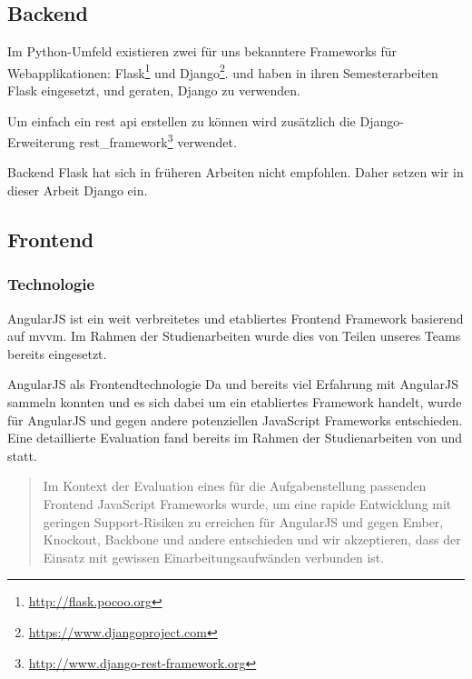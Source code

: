 \subsection{Backend}
Im Python-Umfeld existieren zwei für uns bekanntere Frameworks für Webapplikationen: Flask\footnote{\url{http://flask.pocoo.org}} und Django\footnote{\url{https://www.djangoproject.com}}. \fsc und \rli haben in ihren Semesterarbeiten Flask eingesetzt, und geraten, Django zu verwenden.

Um einfach ein \acs{rest} \acs{api} erstellen zu können wird zusätzlich die Django-Erweiterung rest\_framework\footnote{\url{http://www.django-rest-framework.org}} verwendet.

\begin{decision}{Backend}
Flask hat sich in früheren Arbeiten nicht empfohlen. Daher setzen wir in dieser Arbeit Django ein.
\end{decision}



\subsection{Frontend}
\subsubsection{Technologie}
AngularJS ist ein weit verbreitetes und etabliertes Frontend Framework basierend auf \acs{mvvm}. Im Rahmen der Studienarbeiten wurde dies von Teilen unseres Teams bereits eingesetzt.

\begin{decision}[label=dec:frontend:technology]{AngularJS als Frontendtechnologie}
Da \chuf und \fscf bereits viel Erfahrung mit AngularJS sammeln konnten und es sich dabei um ein etabliertes Framework handelt, wurde für AngularJS und gegen andere potenziellen JavaScript Frameworks entschieden. Eine detaillierte Evaluation fand bereits im Rahmen der Studienarbeiten von \fscf und \rlif statt.
\end{decision}

\begin{quote}
Im Kontext der Evaluation eines für die Aufgabenstellung passenden Frontend JavaScript Frameworks wurde, um eine rapide Entwicklung mit geringen Support-Risiken zu erreichen für AngularJS und gegen Ember, Knockout, Backbone und andere entschieden und wir akzeptieren, dass der Einsatz mit gewissen Einarbeitungsaufwänden verbunden ist.
\cite[S. 37]{poitour}
\end{quote}

